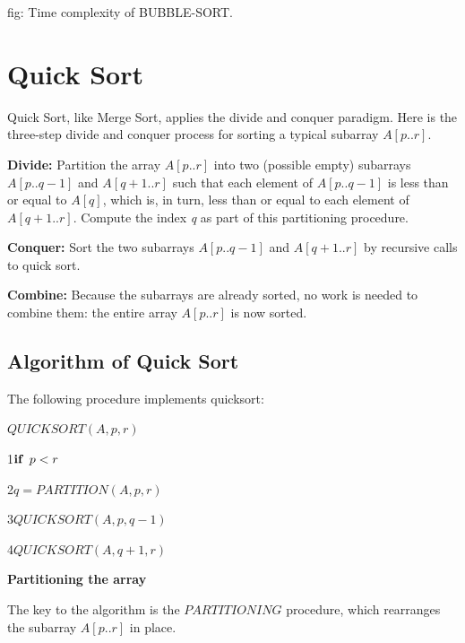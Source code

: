 \documentclass[9 pt]{report}
\begin{document}
\hspace{5cm}fig: Time complexity of BUBBLE-SORT.

\section{\huge Quick Sort}

Quick Sort, like Merge Sort, applies the divide and conquer paradigm. Here is the three-step divide and conquer process for sorting a typical subarray $A[p..r]$.

\textbf{Divide:} Partition the array $A[p..r]$ into two (possible empty) subarrays $A[p..q-1]$ and $A[q+1..r]$ such that each element of $A[p..q-1]$ is less than or equal to $A[q]$, which is, in turn, less than or equal to each element of $A[q+1..r]$. Compute the index \textit{q} as part of this partitioning procedure.

\textbf{Conquer:} Sort the two subarrays $A[p..q-1]$ and $A[q+1..r]$ by recursive calls to quick sort.

\textbf{Combine:} Because the subarrays are already sorted, no work is needed to combine them: the entire array $A[p..r]$ is now sorted.

\subsection{\huge Algorithm of Quick Sort}

The following procedure implements quicksort:

\vspace{1cm}

$QUICKSORT(A,p,r)$

1\hspace{0.5cm}$\textbf{if}\hspace{0.2cm}p<r$

2\hspace{1cm}$q=PARTITION(A,p,r)$

3\hspace{1cm}$QUICKSORT(A,p,q-1)$

4\hspace{1cm}$QUICKSORT(A,q+1,r)$

\vspace{0.5cm}

\textbf{Partitioning the array}

\vspace{0.5cm}

The key to the algorithm is the $PARTITIONING$ procedure, which rearranges the subarray $A[p..r]$ in place.
\end{document}
